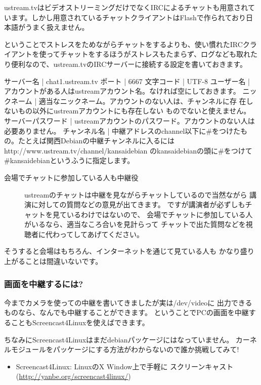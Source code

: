 \documentclass[mingoth,a4paper]{jsarticle}
\begin{document}
ustream.tvはビデオストリーミングだけでなくIRCによるチャットも用意されて
います。しかし用意されているチャットクライアントはFlashで作られており日
本語がうまく扱えません。

ということでストレスをためながらチャットをするよりも、使い慣れたIRCクラ
イアントを使ってチャットをするほうがストレスもたまらず、ログなども取れた
り便利なので、ustream.tvのIRCサーバーに接続する設定を書いておきます。

\begin{commandline}
サーバー名 | chat1.ustream.tv
ポート | 6667
文字コード | UTF-8
ユーザー名 | アカウントがある人はustreamアカウント名。なければ空にしておきます。
ニックネーム | 適当なニックネーム。アカウントのない人は、チャンネルに存
在しないもの以外にustreamアカウントにも存在しない
ものでないと使えません。
サーバーパスワード | ustreamアカウントのパスワード。アカウントのない人は必要ありません。
チャンネル名 | 中継アドレスのchannel以下に#をつけたもの。たとえば関西Debianの中継チャンネルに入るには
http://www.ustream.tv/channel/kansaidebian のkansaidebianの頭に#をつけて#kansaidebianというふうに指定します。
\end{commandline}

\begin{description}
\item[会場でチャットに参加している人も中継役]
ustreamのチャットは中継を見ながらチャットしているので当然ながら
講演に対しての質問などの意見が出てきます。
ですが講演者が必ずしもチャットを見ているわけではないので、
会場でチャットに参加している人がいるなら、適当なころ合いを見計らって
チャットで出た質問などを視聴者に代わってしてあげてください。
\end{description}

そうすると会場はもちろん、インターネットを通じて見ている人も
かなり盛り上がることは間違いないです。

\subsubsection{画面を中継するには?}

今までカメラを使っての中継を書いてきましたが実は/dev/videoに
出力できるものなら、なんでも中継することができます。
ということでPCの画面を中継することもScreencast4Linuxを使えばできます。

ちなみにScreencast4Linuxはまだdebianパッケージにはなっていません。
カーネルモジュールをパッケージにする方法がわからないので誰か挑戦してみて!

\begin{itemize}
 \item Screencast4Linux: LinuxのX Window上で手軽に
       スクリーンキャスト(\url{http://yanbe.org/screencast4linux/})
\end{itemize}
\end{document}
